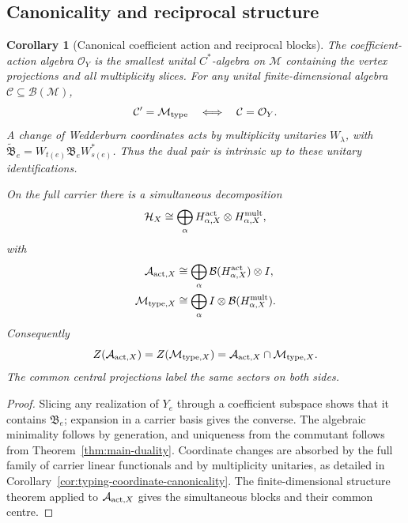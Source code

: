 \documentclass[11pt]{article}
\numberwithin{equation}{section}
\newtheorem{corollary}[theorem]{Corollary}
\theoremstyle{definition}
\theoremstyle{remark}
\newcommand{\A}{\mathcal A}
\newcommand{\Hh}{\mathcal H}
\newcommand{\M}{\mathcal M}
\newcommand{\Oalg}{\mathcal O}
\begin{document}
\subsection{Canonicality and reciprocal structure}

\begin{corollary}[Canonical coefficient action and reciprocal blocks]
\label{cor:reciprocal-wedderburn}
The coefficient-action algebra $\Oalg_Y$ is the smallest unital
$C^*$-algebra on $\mathscr M$ containing the vertex projections and all
multiplicity slices.  For any unital finite-dimensional algebra
$\mathcal C\subseteq\mathcal B(\mathscr M)$,
\begin{equation}
 \mathcal C'=\M_{\rm type}\quad\Longleftrightarrow\quad\mathcal C=\Oalg_Y.
 \label{eq:coefficient-action-universal}
\end{equation}
A change of Wedderburn coordinates acts by multiplicity unitaries
$W_\lambda$, with
$\widetilde{\mathfrak B}_e=W_{t(e)}\mathfrak B_eW_{s(e)}^*$.
Thus the dual pair is intrinsic up to these unitary identifications.

On the full carrier there is a simultaneous decomposition
\begin{equation}
 \Hh_X\cong\bigoplus_\alpha H^{\rm act}_{\alpha,X}
                             \otimes H^{\rm mult}_{\alpha,X},
 \label{eq:wedderburn-H}
\end{equation}
with
\begin{align}
 \A_{{\rm act},X}&\cong\bigoplus_\alpha
   \mathcal B(H^{\rm act}_{\alpha,X})\otimes I,
   \label{eq:wedderburn-action}\\
 \M_{{\rm type},X}&\cong\bigoplus_\alpha
   I\otimes\mathcal B(H^{\rm mult}_{\alpha,X}).
   \label{eq:wedderburn-multiplicity}
\end{align}
Consequently
\begin{equation}
 Z(\A_{{\rm act},X})=Z(\M_{{\rm type},X})
                  =\A_{{\rm act},X}\cap\M_{{\rm type},X}.
 \label{eq:common-centre}
\end{equation}
The common central projections label the same sectors on both sides.
\end{corollary}
\begin{proof}
Slicing any realization of $Y_e$ through a coefficient subspace shows that
it contains $\mathfrak B_e$; expansion in a carrier basis gives the converse.
The algebraic minimality follows by generation, and uniqueness from the
commutant follows from Theorem~\ref{thm:main-duality}.  Coordinate changes
are absorbed by the full family of carrier linear functionals and by
multiplicity unitaries, as detailed in
Corollary~\ref{cor:typing-coordinate-canonicality}.
The finite-dimensional structure theorem applied to $\A_{{\rm act},X}$ gives
the simultaneous blocks and their common centre.
\end{proof}
\end{document}
